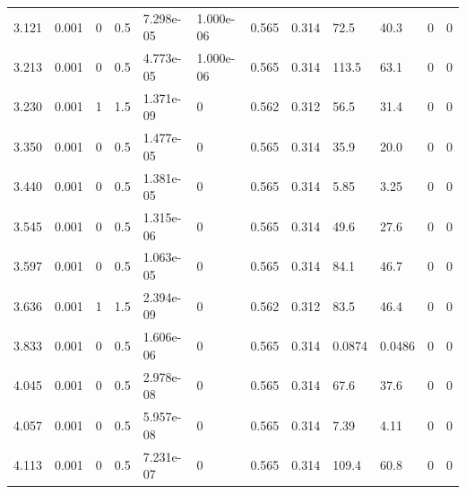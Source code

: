 \documentclass[preview]{standalone}
\begin{document}
{{\begin{tabular}{L{1.2cm}C{1.2cm} C{0.3cm}C{0.5cm} C{1.4cm}C{1.4cm} C{1.4cm}C{1.4cm} C{1.6cm}C{1.6cm} C{1.6cm}C{1.6cm}}
  3.121  &  0.001  & 0     & 0.5 &  7.298e-05  & 1.000e-06  &  0.565&   0.314& 72.5 & 40.3   &  0 & 0  \\ 
  3.213  &  0.001  & 0     & 0.5 &  4.773e-05  & 1.000e-06  &  0.565&   0.314& 113.5 & 63.1   &  0 & 0  \\ 
  3.230  &  0.001  & 1     & 1.5 &  1.371e-09  & 0  &  0.562&   0.312& 56.5 & 31.4   &  0 & 0  \\ 
  3.350  &  0.001  & 0     & 0.5 &  1.477e-05  & 0  &  0.565&   0.314& 35.9 & 20.0   &  0 & 0  \\ 
  3.440  &  0.001  & 0     & 0.5 &  1.381e-05  & 0  &  0.565&   0.314& 5.85 & 3.25   &  0 & 0  \\ 
  3.545  &  0.001  & 0     & 0.5 &  1.315e-06  & 0  &  0.565&   0.314& 49.6 & 27.6   &  0 & 0  \\ 
  3.597  &  0.001  & 0     & 0.5 &  1.063e-05  & 0  &  0.565&   0.314& 84.1 & 46.7   &  0 & 0  \\ 
  3.636  &  0.001  & 1     & 1.5 &  2.394e-09  & 0  &  0.562&   0.312& 83.5 & 46.4   &  0 & 0  \\ 
  3.833  &  0.001  & 0     & 0.5 &  1.606e-06  & 0  &  0.565&   0.314& 0.0874 & 0.0486   &  0 & 0  \\ 
  4.045  &  0.001  & 0     & 0.5 &  2.978e-08  & 0  &  0.565&   0.314& 67.6 & 37.6   &  0 & 0  \\ 
  4.057  &  0.001  & 0     & 0.5 &  5.957e-08  & 0  &  0.565&   0.314& 7.39 & 4.11   &  0 & 0  \\ 
  4.113  &  0.001  & 0     & 0.5 &  7.231e-07  & 0  &  0.565&   0.314& 109.4 & 60.8   &  0 & 0  \\ 
\hline 
\end{tabular} 

}}
\end{document}
